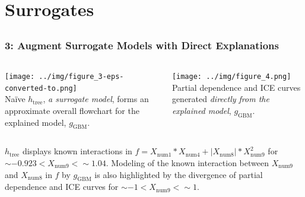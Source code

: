 \documentclass[11pt,aspectratio=169,hyperref={colorlinks}]{beamer}
\begin{document}
	\section{Surrogates}

	\subsection*{} %
	
	\begin{frame}[t]
	
		\frametitle{3: Augment \textbf{Surrogate Models} with \textbf{Direct Explanations}}	
	
		\begin{columns}
				
			\centering			
			\texttt{[image: ../img/figure\_3-eps-converted-to.png]}\\
  			\tiny{Na\"ive $h_{\text{tree}}$, \textit{a surrogate model}, forms an approximate overall flowchart for the explained model, $g_{\text{GBM}}$.}

			\hspace{5pt}
  			\texttt{[image: ../img/figure\_4.png]}\\
  			\tiny{Partial dependence and ICE curves generated \textit{directly from the explained model}, $g_{\text{GBM}}$.}
  			
  		\end{columns}

	\scriptsize{$h_{\text{tree}}$ displays known interactions in $f = X_{\text{num}1} * X_{\text{num}4} + |X_{\text{num}8}| * X_{\text{num}9}^2$ for $\sim -0.923 < X_{\text{num9}} <  \sim 1.04$. Modeling of the known interaction between $X_{\text{num9}}$ and $X_{\text{num8}}$ in $f$ by $g_{\text{GBM}}$ is also highlighted by the divergence of partial dependence and ICE curves for $\sim -1 < X_{\text{num9}} <  \sim 1$.}

	\end{frame}
\end{document}
